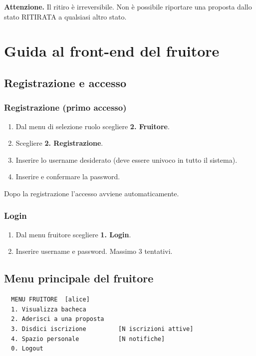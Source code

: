 \documentclass[12pt,a4paper,oneside]{report}
\begin{document}
\begin{avvisobox}
\textbf{Attenzione.} Il ritiro è irreversibile. Non è possibile riportare una proposta dallo stato RITIRATA a qualsiasi altro stato.
\end{avvisobox}

\chapter{Guida al front-end del fruitore}
\label{cap:fruitore}

\section{Registrazione e accesso}

\subsection{Registrazione (primo accesso)}
\begin{enumerate}
  \item Dal menu di selezione ruolo scegliere \textbf{2. Fruitore}.
  \item Scegliere \textbf{2. Registrazione}.
  \item Inserire lo username desiderato (deve essere univoco in tutto il sistema).
  \item Inserire e confermare la password.
\end{enumerate}
Dopo la registrazione l'accesso avviene automaticamente.

\subsection{Login}
\begin{enumerate}
  \item Dal menu fruitore scegliere \textbf{1. Login}.
  \item Inserire username e password. Massimo 3 tentativi.
\end{enumerate}

\section{Menu principale del fruitore}

\begin{lstlisting}
  MENU FRUITORE  [alice]
  1. Visualizza bacheca
  2. Aderisci a una proposta
  3. Disdici iscrizione         [N iscrizioni attive]
  4. Spazio personale           [N notifiche]
  0. Logout
\end{lstlisting}
\end{document}
